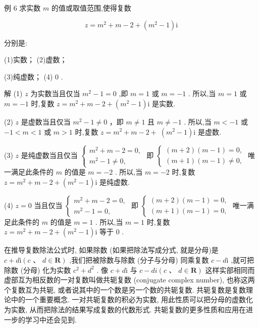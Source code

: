\documentclass[10pt]{article}
\begin{document}
例 6 求实数 \(m\) 的值或取值范围,使得复数

\[
z = {m}^{2} + m - 2 + \left( {{m}^{2} - 1}\right) \mathrm{i}
\]

分别是:

(1)实数； (2)虚数；

(3)纯虚数； (4) 0 .

解 (1) \(z\) 为实数当且仅当 \({m}^{2} - 1 = 0\) ,即 \(m = 1\) 或 \(m =  - 1\) . 所以,当 \(m = 1\) 或 \(m =  - 1\) 时,复数 \(z = {m}^{2} + m - 2 + \left( {{m}^{2} - 1}\right) \mathrm{i}\) 是实数.

(2) \(z\) 是虚数当且仅当 \({m}^{2} - 1 \neq  0\) ，即 \(m \neq  1\) 且 \(m \neq   - 1\) . 所以,当 \(m <  - 1\) 或 \(- 1 < m < 1\) 或 \(m > 1\) 时,复数 \(z = {m}^{2} + m - 2 + \; \left( {{m}^{2} - 1}\right) \mathrm{i}\) 是虚数.

(3) \(z\) 是纯虚数当且仅当 \(\left\{  \begin{array}{l} {m}^{2} + m - 2 = 0, \\  {m}^{2} - 1 \neq  0, \end{array}\right.\) 即 \(\left\{  \begin{array}{l} \left( {m + 2}\right) \left( {m - 1}\right)  = 0, \\  \left( {m + 1}\right) \left( {m - 1}\right)  \neq  0, \end{array}\right.\) 唯一满足此条件的 \(m\) 的值是 \(m =  - 2\) . 所以,当 \(m =  - 2\) 时,复数 \(z = {m}^{2} + m - 2 + \left( {{m}^{2} - 1}\right) \mathrm{i}\) 是纯虚数.

(4) \(z = 0\) 当且仅当 \(\left\{  \begin{array}{l} {m}^{2} + m - 2 = 0, \\  {m}^{2} - 1 = 0, \end{array}\right.\) 即 \(\left\{  \begin{array}{l} \left( {m + 2}\right) \left( {m - 1}\right)  = 0, \\  \left( {m + 1}\right) \left( {m - 1}\right)  = 0, \end{array}\right.\) 唯一满足此条件的 \(m\) 的值是 \(m = 1\) . 所以,当 \(m = 1\) 时,复数 \(z = {m}^{2} + m - 2 + \left( {{m}^{2} - 1}\right) \mathrm{i}\) 等于 0 .

在推导复数除法公式时, 如果除数 (如果把除法写成分式, 就是分母)是 \(c + d\mathrm{i}\left( {c\text{ 、 }d \in  \mathbf{R}}\right)\) ,我们把被除数与除数 (分子与分母) 同乘复数 \(c - d\mathrm{i}\) ,就可把除数 (分母) 化为实数 \({c}^{2} + {d}^{2}\) . 像 \(c + d\mathrm{i}\) 与 \(c - {di}\left( {c\text{ 、 }d \in  \mathbf{R}}\right)\) 这样实部相同而虚部互为相反数的一对复数叫做共轭复数 (conjugate complex number), 也称这两个复数互为共轭, 或者说其中的一个数是另一个数的共轭复数. 共轭复数是复数理论中的一个重要概念. 一对共轭复数的积必为实数, 用此性质可以把分母的虚数化为实数, 从而把除法的结果写成复数的代数形式. 共轭复数的更多性质和应用在进一步的学习中还会见到.
\end{document}
